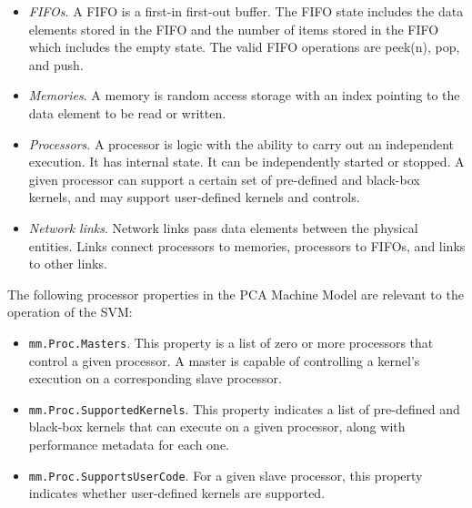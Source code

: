 \begin{itemize}

\item {\it FIFOs}.  A FIFO is a first-in first-out buffer.  The FIFO
state includes the data elements stored in the FIFO and the number of
items stored in the FIFO which includes the empty state.  The valid
FIFO operations are peek(n), pop, and push.

\item {\it Memories}. A memory is random access storage with an index
pointing to the data element to be read or written.

\item {\it Processors}. A processor is logic with the ability to carry
out an independent execution.  It has internal state.  It can be
independently started or stopped.  A given processor can support a
certain set of pre-defined and black-box kernels, and may support
user-defined kernels and controls.

\item {\it Network links}. Network links pass data elements between
the physical entities.  Links connect processors to memories,
processors to FIFOs, and links to other links.

\end{itemize}


The following processor properties in the PCA Machine Model are
relevant to the operation of the SVM:

\begin{itemize}

\item {\tt mm.Proc.Masters}.  This property is a list of zero or more
processors that control a given processor.  A master is capable of
controlling a kernel's execution on a corresponding slave processor.


\item {\tt mm.Proc.SupportedKernels}.  This property indicates a list
of pre-defined and black-box kernels that can execute on a given
processor, along with performance metadata for each one.

\item {\tt mm.Proc.SupportsUserCode}.  For a given slave processor,
this property indicates whether user-defined kernels are supported.

\end{itemize}

